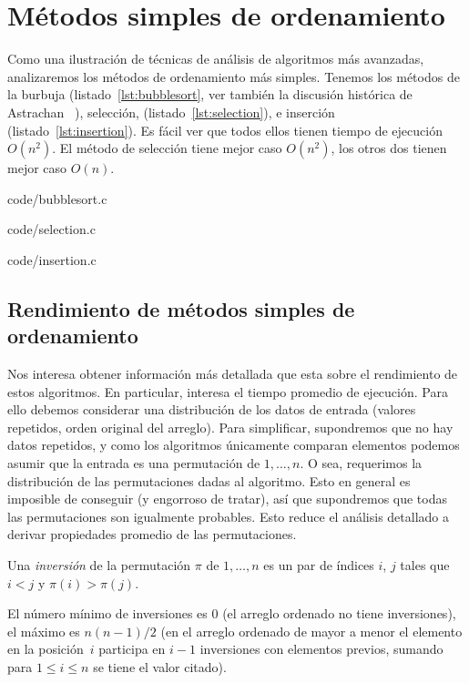 

\chapter{Métodos simples de ordenamiento}
\label{cha:metodos-simples-ordenamiento}

  Como una ilustración de técnicas de análisis de algoritmos más avanzadas,
  analizaremos los métodos de ordenamiento más simples.
  Tenemos los métodos
  de la burbuja
  (listado~\ref{lst:bubblesort},
   ver también la discusión histórica de Astrachan~%
     \cite{astrachan03:_bubble_sort}),
  selección,
  (listado~\ref{lst:selection}),
  e inserción
  (listado~\ref{lst:insertion}).
  Es fácil ver que todos ellos tienen tiempo de ejecución \(O(n^2)\).
  El método de selección tiene mejor caso \(O(n^2)\),
  los otros dos tienen mejor caso \(O(n)\).
  
                  {code/bubblesort.c}
  
                  {code/selection.c}
  
                  {code/insertion.c}

\section{Rendimiento de métodos simples de ordenamiento}
\label{sec:rendimiento-metodos-simples}

  Nos interesa obtener información más detallada que esta
  sobre el rendimiento de estos algoritmos.
  En particular,
  interesa el tiempo promedio de ejecución.
  Para ello debemos considerar una distribución de los datos de entrada
  (valores repetidos,
   orden original del arreglo).
  Para simplificar,
  supondremos que no hay datos repetidos,
  y como los algoritmos únicamente comparan elementos
  podemos asumir que la entrada es una permutación de \(1, \dotsc, n\).
  O sea,
  requerimos la distribución de las permutaciones dadas al algoritmo.
  Esto en general es imposible de conseguir
  (y engorroso de tratar),
  así que supondremos que todas las permutaciones son igualmente probables.
  Esto reduce el análisis detallado a derivar propiedades promedio
  de las permutaciones.
  \begin{definition}
    Una \emph{inversión} de la permutación \(\pi\) de \(1, \dotsc, n\)
    es un par de índices \(i\), \(j\) tales que \(i < j\)
    y \(\pi(i) > \pi(j)\).
  \end{definition}
  El número mínimo de inversiones es \num{0}
  (el arreglo ordenado no tiene inversiones),
  el máximo es \(n (n - 1) / 2\)
  (en el arreglo ordenado de mayor a menor
   el elemento en la posición~\(i\)
   participa en \(i - 1\) inversiones con elementos previos,
   sumando para \(1 \le i \le n\) se tiene el valor citado).

